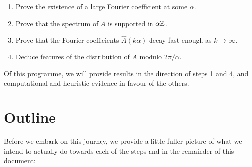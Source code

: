 \documentclass{report}
\theoremstyle{remark}
\numberwithin{equation}{section}
\begin{document}
\begin{enumerate}
  \item Prove the existence of a large Fourier coefficient at
    some $\alpha$.
  \item Prove that the spectrum of $A$ is supported in $\alpha \mathbb{Z}$.  
  \item Prove that the Fourier coefficients $\widehat{A}(k\alpha)$
    decay fast enough as $k \to \infty$.  
  \item Deduce features of the distribution of $A$ modulo
    $2\pi/\alpha$.
\end{enumerate}

Of this programme, we will provide results in the direction of steps 1
and 4, and computational and heuristic evidence in favour of the
others.

\section{Outline}

Before we embark on this journey, we provide a little fuller picture
of what we intend to actually do towards each of the steps and in the
remainder of this document: 
\end{document}
